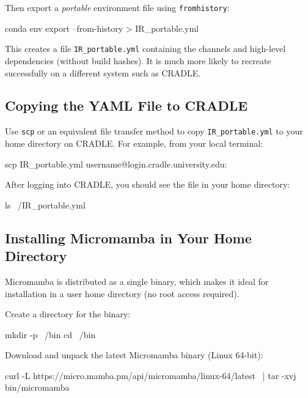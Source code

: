 \documentclass[11pt]{article}
\begin{document}
Then export a \emph{portable} environment file using \texttt{\-\-from\-history}:\\
\begin{codeblock}
conda env export --from-history > IR_portable.yml
\end{codeblock}

This creates a file \texttt{IR\_portable.yml} containing the channels and
high-level dependencies (without build hashes). It is much more likely to
recreate successfully on a different system such as CRADLE.

\subsection{Copying the YAML File to CRADLE}
\label{subsec:copy-yaml}

Use \texttt{scp} or an equivalent file transfer method to copy
\texttt{IR\_portable.yml} to your home directory on CRADLE. For example, from
your local terminal:\\

\begin{codeblock}
scp IR_portable.yml username@login.cradle.university.edu:~
\end{codeblock}

After logging into CRADLE, you should see the file in your home directory:\\
\begin{codeblock}
ls ~/IR_portable.yml
\end{codeblock}

\subsection{Installing Micromamba in Your Home Directory}
\label{subsec:install-micromamba}

Micromamba is distributed as a single binary, which makes it ideal for
installation in a user home directory (no root access required).

Create a directory for the binary:\\
\begin{codeblock}
mkdir -p ~/bin
cd ~/bin
\end{codeblock}

Download and unpack the latest Micromamba binary (Linux 64-bit):\\

\begin{codeblock}
curl -L https://micro.mamba.pm/api/micromamba/linux-64/latest \
  | tar -xvj bin/micromamba
\end{codeblock}
\end{document}
